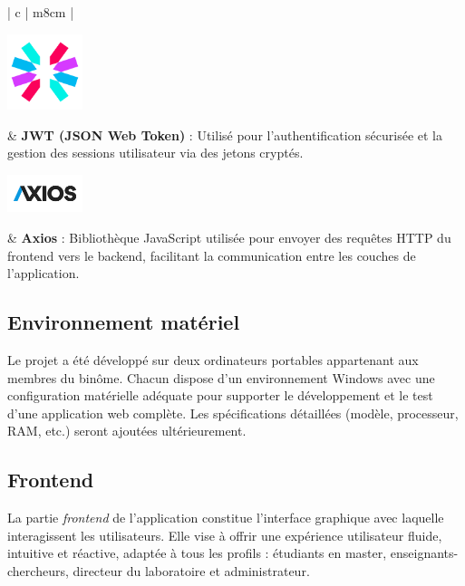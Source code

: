\begin{table}[H]
\begin{tabular}{| c | m{8cm} |}
    \begin{minipage}{.4\linewidth}
        \centering
        \includegraphics[width=2.2cm]{images/logos/JWT.png}
    \end{minipage} 
    & \textbf{JWT (JSON Web Token)} : Utilisé pour l’authentification sécurisée et la gestion des sessions utilisateur via des jetons cryptés. \\
    \hline

    \begin{minipage}{.4\linewidth}
        \centering
        \includegraphics[width=2.2cm]{images/logos/axios.png}
    \end{minipage} 
    & \textbf{Axios} : Bibliothèque JavaScript utilisée pour envoyer des requêtes HTTP du frontend vers le backend, facilitant la communication entre les couches de l’application. \\
    \hline
  \end{tabular}
  \caption{Outils logiciels utilisés dans le développement de la plateforme IReSCoMath}
  \label{tab:outils_irescomath}
\end{table}


\subsection{Environnement matériel}
Le projet a été développé sur deux ordinateurs portables appartenant aux membres du binôme. Chacun dispose d’un environnement Windows avec une configuration matérielle adéquate pour supporter le développement et le test d'une application web complète. Les spécifications détaillées (modèle, processeur, RAM, etc.) seront ajoutées ultérieurement.
\subsection{Frontend}

La partie \textit{frontend} de l’application constitue l’interface graphique avec laquelle interagissent les utilisateurs. Elle vise à offrir une expérience utilisateur fluide, intuitive et réactive, adaptée à tous les profils : étudiants en master, enseignants-chercheurs, directeur du laboratoire et administrateur.

